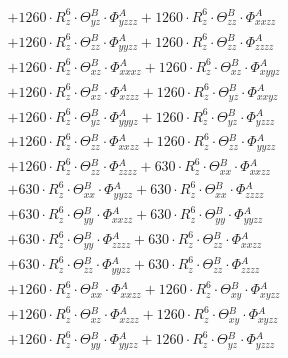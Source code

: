 \documentclass{article}
\begin{document}
\begin{subequations}
\begin{gather}
\begin{array}{c}
 \\[0.2em] 		 + 1260 \cdot R_{z}^{6} \cdot \Theta{}^{B}_{yz} \cdot \Phi{}^{A}_{yzzz}+ 1260 \cdot R_{z}^{6} \cdot \Theta{}^{B}_{zz} \cdot \Phi{}^{A}_{xxzz} 
 \\[0.2em] 		 + 1260 \cdot R_{z}^{6} \cdot \Theta{}^{B}_{zz} \cdot \Phi{}^{A}_{yyzz}+ 1260 \cdot R_{z}^{6} \cdot \Theta{}^{B}_{zz} \cdot \Phi{}^{A}_{zzzz} 
 \\[0.2em] 		 + 1260 \cdot R_{z}^{6} \cdot \Theta{}^{B}_{xz} \cdot \Phi{}^{A}_{xxxz}+ 1260 \cdot R_{z}^{6} \cdot \Theta{}^{B}_{xz} \cdot \Phi{}^{A}_{xyyz} 
 \\[0.2em] 		 + 1260 \cdot R_{z}^{6} \cdot \Theta{}^{B}_{xz} \cdot \Phi{}^{A}_{xzzz}+ 1260 \cdot R_{z}^{6} \cdot \Theta{}^{B}_{yz} \cdot \Phi{}^{A}_{xxyz} 
 \\[0.2em] 		 + 1260 \cdot R_{z}^{6} \cdot \Theta{}^{B}_{yz} \cdot \Phi{}^{A}_{yyyz}+ 1260 \cdot R_{z}^{6} \cdot \Theta{}^{B}_{yz} \cdot \Phi{}^{A}_{yzzz} 
 \\[0.2em] 		 + 1260 \cdot R_{z}^{6} \cdot \Theta{}^{B}_{zz} \cdot \Phi{}^{A}_{xxzz}+ 1260 \cdot R_{z}^{6} \cdot \Theta{}^{B}_{zz} \cdot \Phi{}^{A}_{yyzz} 
 \\[0.2em] 		 + 1260 \cdot R_{z}^{6} \cdot \Theta{}^{B}_{zz} \cdot \Phi{}^{A}_{zzzz}+ 630 \cdot R_{z}^{6} \cdot \Theta{}^{B}_{xx} \cdot \Phi{}^{A}_{xxzz} 
 \\[0.2em] 		 + 630 \cdot R_{z}^{6} \cdot \Theta{}^{B}_{xx} \cdot \Phi{}^{A}_{yyzz}+ 630 \cdot R_{z}^{6} \cdot \Theta{}^{B}_{xx} \cdot \Phi{}^{A}_{zzzz} 
 \\[0.2em] 		 + 630 \cdot R_{z}^{6} \cdot \Theta{}^{B}_{yy} \cdot \Phi{}^{A}_{xxzz}+ 630 \cdot R_{z}^{6} \cdot \Theta{}^{B}_{yy} \cdot \Phi{}^{A}_{yyzz} 
 \\[0.2em] 		 + 630 \cdot R_{z}^{6} \cdot \Theta{}^{B}_{yy} \cdot \Phi{}^{A}_{zzzz}+ 630 \cdot R_{z}^{6} \cdot \Theta{}^{B}_{zz} \cdot \Phi{}^{A}_{xxzz} 
 \\[0.2em] 		 + 630 \cdot R_{z}^{6} \cdot \Theta{}^{B}_{zz} \cdot \Phi{}^{A}_{yyzz}+ 630 \cdot R_{z}^{6} \cdot \Theta{}^{B}_{zz} \cdot \Phi{}^{A}_{zzzz} 
 \\[0.2em] 		 + 1260 \cdot R_{z}^{6} \cdot \Theta{}^{B}_{xx} \cdot \Phi{}^{A}_{xxzz}+ 1260 \cdot R_{z}^{6} \cdot \Theta{}^{B}_{xy} \cdot \Phi{}^{A}_{xyzz} 
 \\[0.2em] 		 + 1260 \cdot R_{z}^{6} \cdot \Theta{}^{B}_{xz} \cdot \Phi{}^{A}_{xzzz}+ 1260 \cdot R_{z}^{6} \cdot \Theta{}^{B}_{xy} \cdot \Phi{}^{A}_{xyzz} 
 \\[0.2em] 		 + 1260 \cdot R_{z}^{6} \cdot \Theta{}^{B}_{yy} \cdot \Phi{}^{A}_{yyzz}+ 1260 \cdot R_{z}^{6} \cdot \Theta{}^{B}_{yz} \cdot \Phi{}^{A}_{yzzz} 

\end{array}
\end{gather}
\end{subequations}
\end{document}
